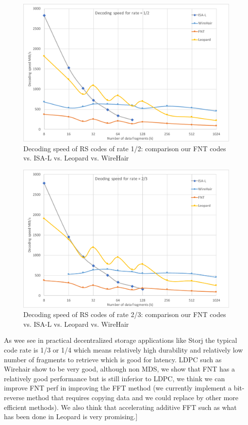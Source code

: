 \documentclass[oneside,9pt]{article}
\begin{document}
\begin{figure}[!ht]
\centering
\includegraphics[width=0.7\columnwidth]{Dec_Rate1-2.pdf}
\caption{Decoding speed of RS codes of rate 1/2: comparison our FNT codes vs. ISA-L vs. Leopard vs. WireHair}
\label{fig:comp_dec_rate_1_2}
\end{figure}

\begin{figure}[!ht]
\centering
\includegraphics[width=0.7\columnwidth]{Dec_Rate2-3.pdf}
\caption{Decoding speed of RS codes of rate 2/3: comparison our FNT codes vs. ISA-L vs. Leopard vs. WireHair}
\label{fig:comp_dec_rate_2_3}
\end{figure}

As wee see in practical decentralized storage applications like Storj the typical code rate is 1/3 or 1/4 which means relatively high durability and relatively low number of fragments to retrieve which is good for latency. LDPC such as Wirehair show to be very good, although non MDS, we show that FNT has a relatively good performance but is still inferior to LDPC, we think we can improve FNT perf in improving the FFT method (we currently implement a bit-reverse method that requires copying data and we could replace by other more efficient methods). We also think that accelerating additive FFT such as what has been done in Leopard \cite{leopard} is very promising.]
\end{document}
